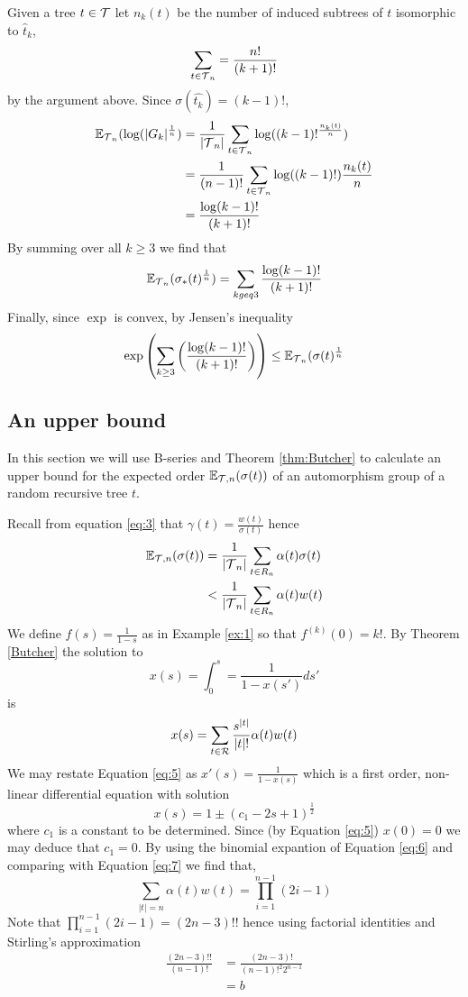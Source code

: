 Given a tree $t \in \operatorname{\mathcal{T}}$ let $n_k(t)$ be the number of induced subtrees of $t$ isomorphic to $\hat{t}_k$,
\[
 \sum_{t \in \operatorname{\mathcal{T}}_n}  = \frac{n!}{(k+1)!}
\]
by the argument above.  Since $\sigma(\hat{t_k}) = (k-1)!$,
\begin{align}
 \mathbb{E}_{\operatorname{\mathcal{T}}_n}(\log(\lvert G_k \rvert^{\frac{1}{n}}) &= \frac{1}{\lvert \operatorname{\mathcal{T}}_n \rvert}\sum_{t \in \operatorname{\mathcal{T}}_n} \log((k-1)!^{\frac{n_k(t)}{n}}) \\
 &= \frac{1}{(n-1)!}\sum_{t \in \operatorname{\mathcal{T}}_n} \log((k-1)!)\frac{n_k(t)}{n} \\
 &= \frac{\log(k-1)!}{(k+1)!}
\end{align}
By summing over all $k \geq 3$ we find that 
\[
\mathbb{E}_{\operatorname{\mathcal{T}}_n}(\sigma_*(t)^{\frac{1}{n}})  = 
 \sum_{k geq 3} \frac{\log(k-1)!}{(k+1)!}
\]
Finally, since $\exp$ is convex,  by Jensen's inequality
\[
 \exp\left(\sum_{k \geq 3}\left( \frac{\log(k-1)!}{(k+1)!} \right)\right) \leq \mathbb{E}_{\operatorname{\mathcal{T}}_n}(\sigma(t)^{\frac{1}{n}}
\]

\subsection{An upper bound}
In this section we will use B-series and Theorem \ref{thm:Butcher} to calculate an upper bound for the expected order 
$\mathbb{E}_{\operatorname{\mathcal{T}},n}(\sigma(t))$ of an automorphism group of a random recursive tree $t$.  

Recall from equation \ref{eq:3} that $\gamma(t) = \frac{w(t)}{\sigma(t)}$ hence
\begin{align}
 \mathbb{E}_{\operatorname{\mathcal{T}},n}(\sigma(t))  &= \frac{1}{\lvert \operatorname{\mathcal{T}}_n \rvert} \sum_{t \in R_n} \alpha(t)\sigma(t)  \\
 &< \frac{1}{\lvert \operatorname{\mathcal{T}}_n \rvert} \sum_{t \in R_n} \alpha(t)w(t)
\end{align}
We define $f(s)= \frac{1}{1-s}$ as in Example \ref{ex:1} so that  $f^{(k)}(0) = k!$.  By Theorem \ref{Butcher} the solution to 
\begin{equation}\label{eq:5}
 x(s) = \int_0^s = \frac{1}{1-x(s')} ds'
\end{equation}
is
\begin{equation}\label{eq:7}
 x(s) = \sum_{t \in \operatorname{\mathcal{R}}} \frac{s^{\lvert t \rvert}}{\lvert t \rvert !}\alpha(t)w(t)
\end{equation}
We may restate Equation \ref{eq:5} as $x'(s) = \frac{1}{1-x(s)}$ which is a first order, non-linear differential equation with 
solution
\begin{equation}\label{eq:6}
  x(s) = 1 \pm (c_1 -2s +1)^{\frac{1}{2}}
\end{equation}
where $c_1$ is a constant to be determined.  Since (by Equation \ref{eq:5}) $x(0) = 0$ we may deduce that $c_1 = 0$.  By using the 
binomial expantion of Equation \ref{eq:6} and comparing with Equation \ref{eq:7} we find that,
\[
 \sum_{\lvert t \rvert = n}\alpha(t)w(t) = \prod_{i=1}^{n-1} (2i-1)
\]
Note that $\prod_{i=1}^{n-1} (2i-1) = (2n-3)!!$ hence using factorial identities and Stirling's approximation 
\begin{align}
 \frac{(2n-3)!!}{(n-1)!} &= \frac{(2n - 3)!}{(n-1)!^2 2^{n-1}} \\
 & = b %
\end{align}

